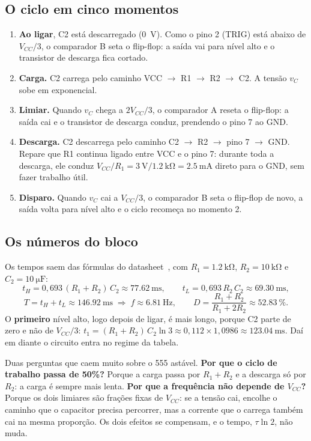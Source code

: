 \documentclass[11pt,a4paper]{article}
\begin{document}
\subsection{O ciclo em cinco momentos}
\begin{enumerate}
  \item \textbf{Ao ligar}, C2 está descarregado (\SI{0}{\volt}). Como o pino 2 (TRIG)
  está abaixo de $V_{CC}/3$, o comparador B seta o flip-flop: a saída vai para nível
  alto e o transistor de descarga fica cortado.
  \item \textbf{Carga.} C2 carrega pelo caminho VCC $\to$ R1 $\to$ R2 $\to$ C2. A tensão
  $v_C$ sobe em exponencial.
  \item \textbf{Limiar.} Quando $v_C$ chega a $2V_{CC}/3$, o comparador A reseta o
  flip-flop: a saída cai e o transistor de descarga conduz, prendendo o pino 7 ao GND.
  \item \textbf{Descarga.} C2 descarrega pelo caminho C2 $\to$ R2 $\to$ pino 7 $\to$ GND.
  Repare que R1 continua ligado entre VCC e o pino 7: durante toda a descarga, ele
  conduz $V_{CC}/R_1 = \SI{3}{\volt}/\SI{1,2}{\kilo\ohm} = \SI{2,5}{\milli\ampere}$ direto
  para o GND, sem fazer trabalho útil.
  \item \textbf{Disparo.} Quando $v_C$ cai a $V_{CC}/3$, o comparador B seta o flip-flop
  de novo, a saída volta para nível alto e o ciclo recomeça no momento 2.
\end{enumerate}

\subsection{Os números do bloco}
Os tempos saem das fórmulas do datasheet~\cite{ne555}, com $R_1 = \SI{1,2}{\kilo\ohm}$,
$R_2 = \SI{10}{\kilo\ohm}$ e $C_2 = \SI{10}{\micro\farad}$:
\[
t_H = 0{,}693\,(R_1+R_2)\,C_2 \approx \SI{77,62}{\milli\second},\qquad
t_L = 0{,}693\,R_2\,C_2 \approx \SI{69,30}{\milli\second},
\]
\[
T = t_H + t_L \approx \SI{146,92}{\milli\second}\;\Rightarrow\; f \approx \SI{6,81}{\hertz},
\qquad D = \frac{R_1+R_2}{R_1+2R_2} \approx \SI{52,83}{\percent}.
\]
O \textbf{primeiro} nível alto, logo depois de ligar, é mais longo, porque C2 parte de
zero e não de $V_{CC}/3$: $t_{1} = (R_1+R_2)\,C_2\ln 3 \approx 0{,}112 \times 1{,}0986
\approx \SI{123,04}{\milli\second}$. Daí em diante o circuito entra no regime da tabela.

\begin{dicaprof}
Duas perguntas que caem muito sobre o 555 astável. \textbf{Por que o ciclo de trabalho
passa de 50\%?} Porque a carga passa por $R_1 + R_2$ e a descarga só por $R_2$: a carga é
sempre mais lenta. \textbf{Por que a frequência não depende de $V_{CC}$?} Porque os dois
limiares são frações fixas de $V_{CC}$: se a tensão cai, encolhe o caminho que o
capacitor precisa percorrer, mas a corrente que o carrega também cai na mesma proporção.
Os dois efeitos se compensam, e o tempo, $\tau\ln 2$, não muda.
\end{dicaprof}
\end{document}
